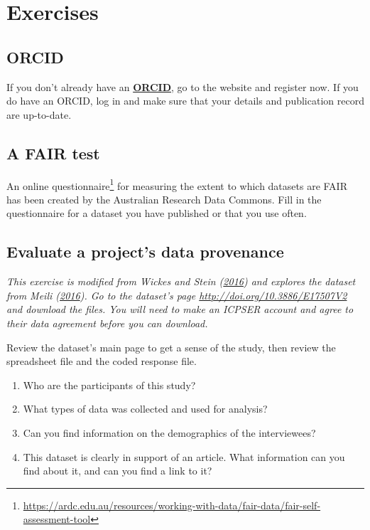 \documentclass[
]{krantz}
\providecommand{\tightlist}{%
  \setlength{\itemsep}{0pt}\setlength{\parskip}{0pt}}
\renewcommand{\href}[2]{#2\footnote{\url{#1}}}
\newcommand{\gref}[2]{\hyperlink{#2}{\textbf{#1}}}
\begin{document}
\hypertarget{provenance-exercises}{%
\section{Exercises}\label{provenance-exercises}}

\hypertarget{provenance-ex-get-orcid}{%
\subsection{ORCID}\label{provenance-ex-get-orcid}}

If you don't already have an \gref{ORCID}{orcid},
go to the website and register now.
If you do have an ORCID,
log in and make sure that your details and publication record are up-to-date.

\hypertarget{provenance-ex-fair-test}{%
\subsection{A FAIR test}\label{provenance-ex-fair-test}}

An \href{https://ardc.edu.au/resources/working-with-data/fair-data/fair-self-assessment-tool}{online questionnaire}
for measuring the extent to which datasets are FAIR
has been created by the Australian Research Data Commons.
Fill in the questionnaire for a dataset you have published or that you use often.

\hypertarget{provenance-ex-understand-project}{%
\subsection{Evaluate a project's data provenance}\label{provenance-ex-understand-project}}

\emph{This exercise is modified from Wickes and Stein (\protect\hyperlink{ref-Wick2016}{2016}) and explores the dataset from Meili (\protect\hyperlink{ref-Meil2015}{2016}).
Go to the dataset's page \url{http://doi.org/10.3886/E17507V2} and download the files.
You will need to make an ICPSER account and agree to their data agreement before you can download.}

Review the dataset's main page to get a sense of the study,
then review the spreadsheet file and the coded response file.

\begin{enumerate}
\def\labelenumi{\arabic{enumi}.}
\tightlist
\item
  Who are the participants of this study?
\item
  What types of data was collected and used for analysis?
\item
  Can you find information on the demographics of the interviewees?
\item
  This dataset is clearly in support of an article.
  What information can you find about it, and can you find a link to it?
\end{enumerate}
\end{document}
